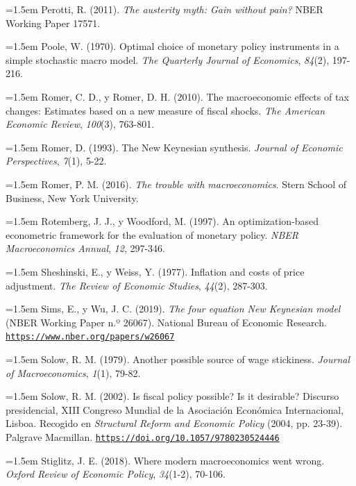 \documentclass[10pt,a4paper]{article}
\begin{document}
\noindent\hangindent=1.5em Perotti, R. (2011). \textit{The austerity myth: Gain without pain?} NBER Working Paper 17571.

\noindent\hangindent=1.5em Poole, W. (1970). Optimal choice of monetary policy instruments in a simple stochastic macro model. \textit{The Quarterly Journal of Economics}, \textit{84}(2), 197-216.

\noindent\hangindent=1.5em Romer, C. D., y Romer, D. H. (2010). The macroeconomic effects of tax changes: Estimates based on a new measure of fiscal shocks. \textit{The American Economic Review}, \textit{100}(3), 763-801.

\noindent\hangindent=1.5em Romer, D. (1993). The New Keynesian synthesis. \textit{Journal of Economic Perspectives}, \textit{7}(1), 5-22.

\noindent\hangindent=1.5em Romer, P. M. (2016). \textit{The trouble with macroeconomics}. Stern School of Business, New York University.

\noindent\hangindent=1.5em Rotemberg, J. J., y Woodford, M. (1997). An optimization-based econometric framework for the evaluation of monetary policy. \textit{NBER Macroeconomics Annual}, \textit{12}, 297-346.

\noindent\hangindent=1.5em Sheshinski, E., y Weiss, Y. (1977). Inflation and costs of price adjustment. \textit{The Review of Economic Studies}, \textit{44}(2), 287-303.

\noindent\hangindent=1.5em Sims, E., y Wu, J. C. (2019). \textit{The four equation New Keynesian model} (NBER Working Paper n.º 26067). National Bureau of Economic Research. \href{https://www.nber.org/papers/w26067}{\nolinkurl{https://www.nber.org/papers/w26067}}

\noindent\hangindent=1.5em Solow, R. M. (1979). Another possible source of wage stickiness. \textit{Journal of Macroeconomics}, \textit{1}(1), 79-82.

\noindent\hangindent=1.5em Solow, R. M. (2002). Is fiscal policy possible? Is it desirable? Discurso presidencial, XIII Congreso Mundial de la Asociación Económica Internacional, Lisboa. Recogido en \textit{Structural Reform and Economic Policy} (2004, pp. 23-39). Palgrave Macmillan. \href{https://doi.org/10.1057/9780230524446}{\nolinkurl{https://doi.org/10.1057/9780230524446}}

\noindent\hangindent=1.5em Stiglitz, J. E. (2018). Where modern macroeconomics went wrong. \textit{Oxford Review of Economic Policy}, \textit{34}(1-2), 70-106.
\end{document}
